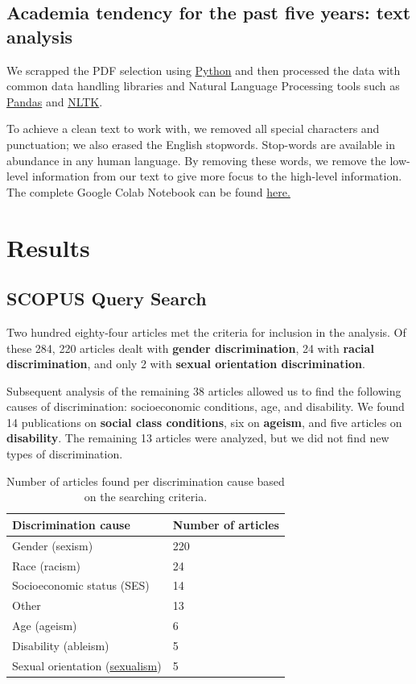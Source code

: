 \documentclass[runningheads]{llncs}
\begin{document}
\subsection{Academia tendency for the past five years: text analysis}
We scrapped the PDF selection using \href{https://www.python.org/}{Python} and then processed the data with common data handling libraries and Natural Language Processing tools such as \href{https://pandas.pydata.org/}{Pandas} and \href{https://www.nltk.org/}{NLTK}. 

To achieve a clean text to work with, we removed all special characters and punctuation; we also erased the English stopwords. Stop-words are available in abundance in any human language. By removing these words, we remove the low-level information from our text to give more focus to the high-level information. The complete Google Colab Notebook can be found  \href{https://colab.research.google.com/drive/1IjIltXAYM-fAM2dUuPyqpsezf4HZf19G?usp=sharing}{here.}
\section{Results}
\subsection{SCOPUS Query Search}
Two hundred eighty-four articles met the criteria for inclusion in the analysis. Of these 284, 220 articles dealt with \textbf{gender discrimination}, 24 with \textbf{racial discrimination}, and only 2 with \textbf{sexual orientation discrimination}. 

Subsequent analysis of the remaining 38 articles allowed us to find the following causes of discrimination: socioeconomic conditions, age, and disability. We found 14 publications on \textbf{social class conditions}, six on \textbf{ageism}, and five articles on \textbf{disability}. The remaining 13 articles were analyzed, but we did not find new types of discrimination.
\begin{table}
\caption{Number of articles found per discrimination cause based on the searching criteria.}\label{tab1}
\centering
\begin{tabular}{|l|l|}
\hline
Discrimination cause & Number of articles\\
\hline
Gender (sexism) & 220 \\
Race (racism) & 24 \\
Socioeconomic status (SES) & 14 \\
Other & 13 \\
Age (ageism) & 6 \\
Disability (ableism) & 5 \\
Sexual orientation (\href{https://www.collinsdictionary.com/dictionary/english/sexualism}{sexualism}) & 5 \\ 
\hline
\end{tabular}
\end{table}
\end{document}
